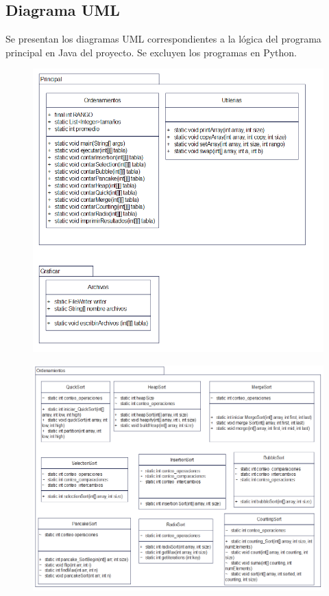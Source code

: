 \documentclass[a4paper,12pt]{article}
\begin{document}
\newpage
\subsection{Diagrama UML}

Se presentan los diagramas UML correspondientes a la lógica del programa principal en Java del proyecto. Se excluyen los programas en Python.

\begin{figure}[h] 
    \centering
    \includegraphics[width=1\textwidth]{media/UML1.PNG} 
\end{figure}

\begin{figure}[h] 
    \centering
    \includegraphics[width=1\textwidth]{media/UML2.PNG} 
\end{figure}
\end{document}
